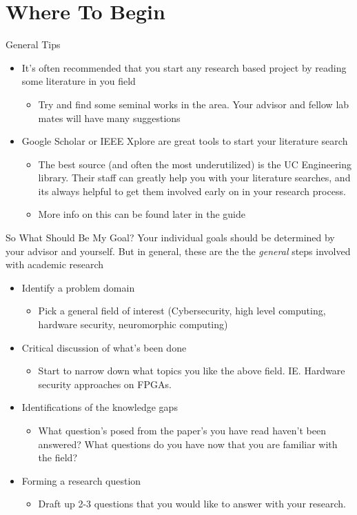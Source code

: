 \documentclass[handout]{beamer}
\begin{document}
\section{Where To Begin}
\begin{frame}{General Tips}
\begin{itemize}
  \item It's often recommended that you start any research based project by reading some literature in you field
  \begin{itemize}
      \item Try and find some seminal works in the area. Your advisor and fellow lab mates will have many suggestions
  \end{itemize}
  \item Google Scholar or IEEE Xplore are great tools to start your literature search
  \begin{itemize}
      \item The best source (and often the most underutilized) is the UC Engineering library. Their staff can greatly help you with your literature searches, and its always helpful to get them involved early on in your research process.
      \item More info on this can be found later in the guide
  \end{itemize}
\end{itemize}
\end{frame}

\begin{frame}{So What Should Be My Goal?}
Your individual goals should be determined by your advisor and yourself. But in general, these are the the \textit{general} steps involved with academic research
\begin{itemize}
  \item Identify a problem domain
  \begin{itemize}
      \item Pick a general field of interest (Cybersecurity, high level computing, hardware security, neuromorphic computing)
  \end{itemize}
  \item Critical discussion of what's been done
  \begin{itemize}
      \item Start to narrow down what topics you like the above field. IE. Hardware security approaches on FPGAs.
  \end{itemize}
  \item Identifications of the knowledge gaps
  \begin{itemize}
      \item What question's posed from the paper's you have read haven't been answered? What questions do you have now that you are familiar with the field?
  \end{itemize}
  \item Forming a research question
  \begin{itemize}
      \item Draft up 2-3 questions that you would like to answer with your research. 
  \end{itemize}
\end{itemize}
\end{frame}
\end{document}
